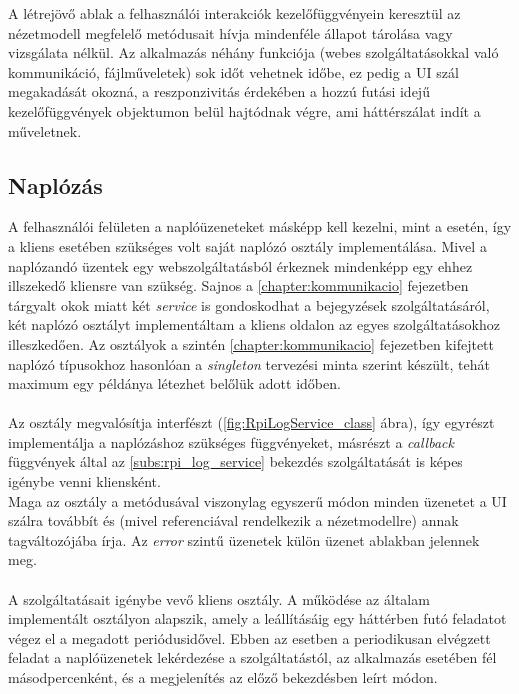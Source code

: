 A létrejövő ablak a felhasználói interakciók kezelőfüggvényein keresztül az nézetmodell megfelelő metódusait hívja mindenféle állapot tárolása vagy vizsgálata nélkül. Az alkalmazás néhány funkciója (webes szolgáltatásokkal való kommunikáció, fájlműveletek) sok időt vehetnek időbe, ez pedig a UI szál megakadását okozná, a reszponzivitás érdekében a hozzú futási idejű kezelőfüggvények  objektumon belül hajtódnak végre, ami háttérszálat indít a műveletnek.

\subsection{Naplózás} \label{subs:client_log}

A felhasználói felületen a naplóüzeneteket másképp kell kezelni, mint a  esetén, így a kliens esetében szükséges volt saját naplózó osztály implementálása. Mivel a naplózandó üzentek egy webszolgáltatásból érkeznek mindenképp egy ehhez illszekedő kliensre van szükség. Sajnos a \ref{chapter:kommunikacio} fejezetben tárgyalt okok miatt két \emph{service} is gondoskodhat a bejegyzések szolgáltatásáról, két naplózó osztályt implementáltam a kliens oldalon az egyes szolgáltatásokhoz illeszkedően. Az osztályok a szintén \ref{chapter:kommunikacio} fejezetben kifejtett naplózó típusokhoz hasonlóan a \emph{singleton} tervezési minta szerint készült, tehát maximum egy példánya létezhet belőlük adott időben.

\paragraph{} Az osztály megvalósítja  interfészt (\ref{fig:RpiLogService_class} ábra), így egyrészt implementálja a naplózáshoz szükséges függvényeket, másrészt a \emph{callback} függvények által az \ref{subs:rpi_log_service} bekezdés  szolgáltatását is képes igénybe venni kliensként.\\
Maga az osztály a  metódusával viszonylag egyszerű módon minden üzenetet a UI szálra továbbít és (mivel referenciával rendelkezik a nézetmodellre) annak  tagváltozójába írja. Az \emph{error} szintű üzenetek külön üzenet ablakban jelennek meg.

\paragraph{} A  szolgáltatásait igénybe vevő kliens osztály. A működése az általam implementált  osztályon alapszik, amely a leállításáig egy háttérben futó feladatot végez el a megadott periódusidővel. Ebben az esetben a periodikusan elvégzett feladat a naplóüzenetek lekérdezése a szolgáltatástól, az alkalmazás esetében fél másodpercenként, és a megjelenítés az előző bekezdésben leírt módon.

